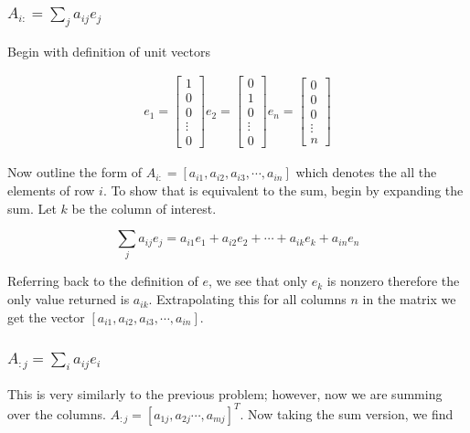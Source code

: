 \documentclass[11pt,a4paper,final]{article}
\begin{document}
\subsubsection{\(A_{i:} = \sum_j a_{ij}e_{j}\)}
\label{sec:orgeed3aa4}
Begin with definition of unit vectors

\begin{equation*}
\begin{array}{ccc}
e_1 =
\begin{bmatrix}
1 \\ 0 \\ 0 \\ \vdots \\ 0
\end{bmatrix}
e_2 =
\begin{bmatrix}
0 \\ 1 \\ 0 \\ \vdots \\ 0
\end{bmatrix}
e_n =
\begin{bmatrix}
0 \\ 0 \\ 0 \\ \vdots \\ n
\end{bmatrix}
\end{array}
\end{equation*}

Now outline the form of \(A_{i:} = [a_{i1},a_{i2},a_{i3},\cdots,a_{in}]\) which denotes the all the elements of row \(i\). To
show that is equivalent to the sum, begin by expanding the sum. Let \(k\) be the column of interest.

\begin{equation*}
\sum_j a_{ij}e_j = a_{i1}e_1 + a_{i2}e_2 + \cdots + a_{ik}e_{k} + a_{in}e_n
\end{equation*}

Referring back to the definition of \(e\), we see that only \(e_k\) is nonzero therefore the only value returned is
\(a_{ik}\). Extrapolating this for all columns \(n\) in the matrix we get the vector \([a_{i1},a_{i2},a_{i3},\cdots,a_{in}]\).

\subsubsection{\(A_{:j} = \sum_i a_{ij}e_{i}\)}
\label{sec:org2ec84aa}
This is very similarly to the previous problem; however, now we are summing over the columns. \(A_{:j} = [a_{1j},a_{2j}
\cdots,a_{mj}]^T\). Now taking the sum version, we find
\end{document}
